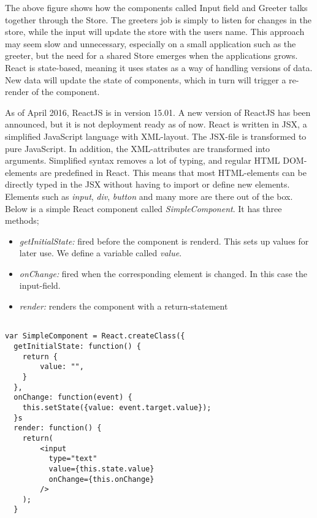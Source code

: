 
{

The above figure shows how the components called Input field and Greeter talks together through the Store. The greeters job is simply to listen for changes in the store, while the input will update the store with the users name. This approach may seem slow and unnecessary, especially on a small application such as the greeter, but the need for a shared Store emerges when the applications grows. React is state-based, meaning it uses states as a way of handling versions of data. New data will update the state of components, which in turn will trigger a re-render of the component. 

As of April 2016, ReactJS is in version 15.01. A new version of ReactJS has been announced, but it is not deployment ready as of now. React is written in JSX, a simplified JavaScript language with XML-layout. The JSX-file is transformed to pure JavaScript. In addition, the XML-attributes are transformed into arguments. Simplified syntax removes a lot of typing, and regular HTML DOM-elements are predefined in React. This means that most HTML-elements can be directly typed in the JSX without having to import or define new elements. Elements such as \emph{input}, \emph{div}, \emph{button} and many more are there out of the box. Below is a simple React component called \emph{SimpleComponent}. It has three methods;


\begin{itemize}
\item \emph{getInitialState:} fired before the component is renderd. This sets up
values for later use. We define a variable called \emph{value}. 
\item \emph{onChange:} fired when the corresponding element is changed. In this case the input-field.
\item \emph{render:} renders the component with a return-statement
\end{itemize}








\begin{lstlisting}[caption=Simple React element with onClick-handlers, label=lst:simplecomponent]

var SimpleComponent = React.createClass({
  getInitialState: function() {
    return {
		value: "",
    }
  },
  onChange: function(event) {
  	this.setState({value: event.target.value});
  }s
  render: function() {
	return(
		<input 
		  type="text"
		  value={this.state.value}
		  onChange={this.onChange}
		/>	
	);  
  }  
\end{lstlisting}

}
